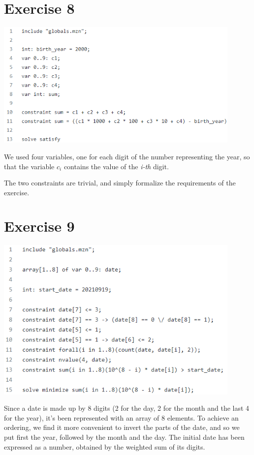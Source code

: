 \documentclass{article}
\begin{document}
\section{Exercise 8}
\vspace{0.2cm}
\includegraphics[width=12cm]{img/Es8.png}
\vspace{0.2cm}

We used four variables, one for each digit of the number representing the year, so that the variable
\textit{$c_i$} contains the value of the \textit{i-th} digit. 

The two constraints are trivial, and simply formalize the requirements of the exercise.

\section{Exercise 9}
\vspace{0.2cm}
\includegraphics[width=12cm]{img/Es9.png}
\vspace{0.2cm}

Since a date is made up by 8 digits (2 for the day, 2 for the month and the last 4 for the year),
it's been represented with an array of 8 elements. To achieve an ordering, we find it more convenient
to invert the parts of the date, and so we put first the year, followed by the month and the day.
The initial date has been expressed as a number, obtained by the weighted sum of its digits.
\end{document}
